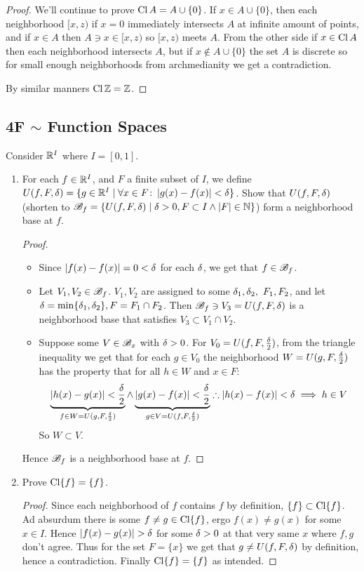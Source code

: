 \documentclass[a4paper]{article}
\newcommand\nsubsection[1]{\subsection*{#1}\addcontentsline{toc}{subsection}{#1}}
\begin{document}
\begin{enumerate}
\begin{proof}
			We'll continue to prove $\operatorname{Cl} A = A \cup \{0\}$. If $x \in A \cup \{0\}$, then each neighborhood $[x, z)$ if $x = 0$ immediately intersects $A$ at infinite amount of points, and if $x \in A$ then $A \ni x \in [x, z)$ so $[x, z)$ meets $A$. From the other side if $x \in \operatorname{Cl} A$ then each neighborhood intersects $A$, but if $x \notin A \cup \{0\}$ the set $A$ is discrete so for small enough neighborhoods from archmedianity we get a contradiction. 
			
			By similar manners $\operatorname{Cl} \mathbb{Z} = \mathbb{Z}$. 
		\end{proof}
	\end{enumerate}
	
	\nsubsection{4F $\sim$ Function Spaces}
	Consider $\mathbb{R}^{I}$ where $I = [0, 1]$. 
	\begin{enumerate}
		\item For each $f \in \mathbb{R}^{I}$, and $F$ a finite subset of $I$, we define $U(f, F, \delta) = \{g \in \mathbb{R}^{I} \mid \forall x \in F \colon \left \lvert g(x) - f(x) \right \rvert < \delta\}$. Show that $U(f, F, \delta)$ (shorten to $\mathscr{B}_f = \{U(f, F, \delta) \mid \delta > 0, F \subset I \land \left \lvert F \right \rvert \in \mathbb{N}\}$) form a neighborhood base at $f$. 
		\begin{proof}
			\begin{itemize}
				\item[\textit{V}-a] Since $\left \lvert f(x) - f(x) \right \rvert = 0 < \delta$ for each $\delta$, we get that $f \in \mathscr{B}_f$. 
				\item[\textit{V}-b] Let $V_1, V_2 \in \mathscr{B}_f$. $V_1, V_2$ are assigned to some $\delta_1, \delta_2, \ F_1, F_2$, and let $\delta = \min\{\delta_1, \delta_2\}, F = F_1 \cap F_2$. Then $\mathscr{B}_f \ni V_3 = U(f, F, \delta)$ is a neighborhood base that satisfies $V_3 \subset V_1 \cap V_2$. 
				\item[\textit{V}-c] Suppose some $V \in \mathscr{B}_x$ with $\delta > 0$. For $V_0 = U(f, F, \frac{\delta}{2})$, from the triangle inequality we get that for each $g \in V_0$ the neighborhood $W = U(g, F, \frac{\delta}{2})$ has the property that for all $h \in W$ and $x\in F$:
				\[ \underbrace{\left \lvert h(x) - g(x) \right \rvert < \frac{\delta}{2}}_{f \in W = U(g, F, \frac{\delta}{2})} \land \underbrace{\left \lvert g(x) - f(x) \right \rvert < \frac{\delta}{2}}_{g \in V = U(f, F, \frac{\delta}{2})} \therefore \left \lvert h(x) - f(x) \right \rvert < \delta \implies h \in V \]
				So $W \subset V$. 
			\end{itemize}
			Hence $\mathscr{B}_f$ is a neighborhood base at $f$. 
		\end{proof}
		\item Prove $\operatorname{Cl} \{f\} = \{f\}$. \begin{proof}
			Since each neighborhood of $f$ contains $f$ by definition, $\{f\} \subset \operatorname{Cl} \{f\}$. Ad absurdum there is some $f \neq g \in \operatorname{Cl}\{f\}$, ergo $f(x) \neq g(x)$ for some $x \in I$. Hence $\left \lvert f(x) - g(x) \right \rvert > \delta$ for some $\delta > 0$ at that very same $x$ where $f, g$ don't agree. Thus for the set $F = \{x\}$ we get that $g \neq U(f, F, \delta)$ by definition, hence a contradiction. Finally $\operatorname{Cl} \{f\} = \{f\}$ as intended. 

\end{proof}
\end{enumerate}
\end{document}
